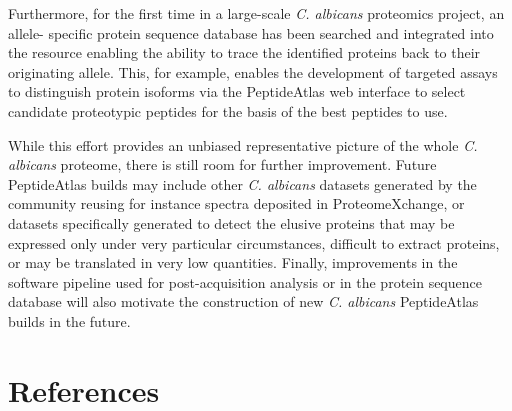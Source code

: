 Furthermore, for the first time in a large-scale \textit{C. albicans} proteomics project, an allele-
specific protein sequence database has been searched and integrated into the resource
enabling the ability to trace the identified proteins back to their originating allele. This, for
example, enables the development of targeted assays to distinguish protein isoforms via the
PeptideAtlas web interface \citep{Farrah2011} to select candidate proteotypic peptides for the basis of the
best peptides to use.

While this effort provides an unbiased representative picture of the whole \textit{C. albicans}
proteome, there is still room for further improvement. Future PeptideAtlas builds may include other \textit{C. albicans}
datasets generated by the community reusing for instance spectra deposited in ProteomeXchange,
or datasets specifically generated to detect the elusive proteins that may be expressed only
under very particular circumstances, difficult to extract proteins, or may be translated in very
low quantities. Finally, improvements in the software pipeline used for post-acquisition
analysis or in the protein sequence database will also motivate the construction of new
\textit{C. albicans} PeptideAtlas builds in the future.











\section*{References}

